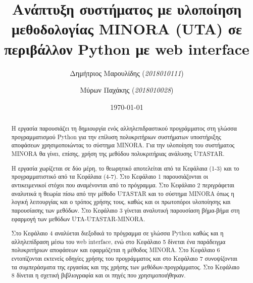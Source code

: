 \documentclass[11pt,a4paper,titlepage]{article}
\author{Δημήτριος Μαρουλίδης (\textit{2018010111}) \and
    Μύρων Παχάκης (\textit{2018010028})}
\title{Ανάπτυξη συστήματος με υλοποίηση μεθοδολογίας MINORA (UTA) σε περιβάλλον Python με web interface}
\date{\today}
\numberwithin{equation}{section}
\begin{document}
\maketitle	
\tableofcontents

\clearpage

\begin{abstract}
Η εργασία παρουσιάζει τη δημιουργία ενός αλληλεπιδραστικού προγράμματος στη γλώσσα προγραμματισμού Python για την επίλυση πολυκριτήριων συστήματων υποστήριξης αποφάσεων χρησιμοποιώντας το σύστημα MINORA. Για την υλοποίηση του συστήματος MINORA θα γίνει, επίσης, χρήση της μεθόδου πολυκριτήριας ανάλυσης UTASTAR. 

Η εργασία χωρίζεται σε δύο μέρη, το θεωρητικό αποτελείται από τα Κεφάλαια (1-3) και το προγραμματιστικό από τα Κεφάλαια (4-7). Στο Κεφάλαιο 1 παρουσιάζονται οι αντικειμενικοί στόχοι που αναμένονται από το πρόγραμμα. Στο Κεφάλαιο 2 περιγράφεται αναλυτικά η θεωρία πίσω από την μέθοδο UTASTAR και το σύστημα MINORA όπως η λογική λειτουργίας και ο τρόπος χρήσης τους, καθώς και οι πρωτοπόροι υλοποίησης και παρουσίασης των μεθόδων. Στο Κεφάλαιο 3 γίνεται αναλυτική παρουσίαση βήμα-βήμα στη εφαρμογή των μεθόδων UTA-UTASTAR-MINORA.

Στο Κεφάλαιο 4 αναλύεται διεξοδικά το πρόγραμμα σε γλώσσα Python καθώς και η αλληλεπίδραση μέσω του web interface, ενώ στο Κεφάλαιο 5 δίνεται ένα παράδειγμα πολυκριτήριων αποφάσεων και εφαρμόζεται η μέθοδος MINORA. Στο Κεφάλαιο 6 εντοπίζονται εκτενείς οδηγίες χρήσης του προγράμματος και στο Κεφάλαιο 7 συνοψίζονται τα συμπεράσματα της εργασίας και της χρήσης των μεθόδων-προγράμματος. Στο Κεφάλαιο 8 δίνεται η σχετική βιβλιογραφία και οι πηγές που χρησιμοποιήθηκαν.
\end{abstract}


\end{document}
